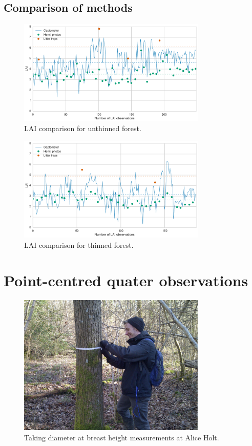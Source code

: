 \documentclass[11pt]{article}
\begin{document}
\subsection{Comparison of methods}

\begin{figure}[ht]
    \centering
    \includegraphics[width=0.8\textwidth]{thinned07.pdf}
    \caption{LAI comparison for unthinned forest.} \label{fig:lai_comp07}
\end{figure}

\begin{figure}[ht]
    \centering
    \includegraphics[width=0.8\textwidth]{thinned14.pdf}
    \caption{LAI comparison for thinned forest.} \label{fig:lai_comp14}
\end{figure}

\section{Point-centred quater observations}

\begin{figure}[ht]
    \centering
    \includegraphics[width=0.8\textwidth]{dbh_me.pdf}
    \caption{Taking diameter at breast height measurements at Alice Holt.} \label{fig:dbh_me}
\end{figure}
\end{document}
